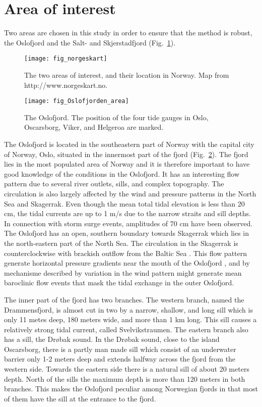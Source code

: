 \section{Area of interest}
Two areas are chosen in this study in order to ensure that the method is robust, the Oslofjord and the Salt- and Skjerstadfjord (Fig.~\ref{fig:area0}).

\begin{figure}[!t]
\centering
\texttt{[image: fig\_norgeskart]}
\caption{The two areas of interest, and their location in Norway. Map from http://www.norgeskart.no.}
\label{fig:area0}
\end{figure}

\begin{figure}[!t]
\centering
\texttt{[image: fig\_Oslofjorden\_area]}
\caption{The Oslofjord. The position of the four tide gauges in Oslo, Oscarsborg, Viker, and Helgeroa are marked.}
\label{fig:area1}
\end{figure}

The Oslofjord is located in the southeastern part of Norway with the capital city of Norway, Oslo, situated in the innermost part of the fjord (Fig.~\ref{fig:area1}). The fjord lies in the most populated area of Norway and it is therefore important to have good knowledge of the conditions in the Oslofjord. It has an interesting flow pattern due to several river outlets, sills, and complex topography. The circulation is also largely affected by the wind and pressure patterns in the North Sea and Skagerrak. 
Even though the mean total tidal elevation is less than 20 cm, the tidal currents are up to 1 m/s due to the narrow straits and sill depths. In connection with storm surge events, amplitudes of 70 cm have been observed. The Oslofjord has an open, southern boundary towards Skagerrak which lies in the north-eastern part of the North Sea. The circulation in the Skagerrak is counterclockwise with brackish outflow from the Baltic Sea \cite[]{rodhe96,svendsen96}. This flow pattern generate horizontal pressure gradients near the mouth of the Oslofjord \cite[]{baals90}, and by mechanisme described by \cite{klinck81} variation in the wind pattern might generate mean baroclinic flow events that mask the tidal exchange in the outer Oslofjord.

The inner part of the fjord has two branches. The western branch, named the Drammensfjord, is almost cut in two by a narrow, shallow, and long sill which is only 11 metes deep, 180 meters wide, and more than 1 km long. This sill causes a relatively strong tidal current, called Svelvikstraumen. The eastern branch also has a sill, the Dr{\o}bak sound. In the Dr{\o}bak sound, close to the island Oscarsborg, there is a partly man made sill which consist of an underwater barrier only 1-2 meters deep and extends halfway across the fjord from the western side. Towards the eastern side there is a natural sill of about 20 meters depth. North of the sills the maximum depth is more than 120 meters in both branches. This makes the Oslofjord peculiar among Norwegian fjords in that most of them have the sill at the entrance to the fjord.

